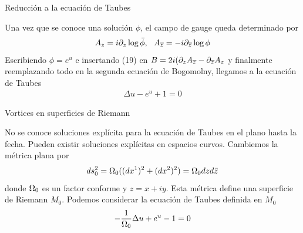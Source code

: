 \documentclass[11pt,t]{beamer}
\begin{document}
\begin{frame}{Reducción a la ecuación de Taubes}

Una vez que se conoce una solución $\phi$, el campo de gauge queda determinado por
\begin{align}
    A_{z} = i\partial_{z}\log\bar\phi, \ \ A_{\overline z} = -i\partial_{\overline z}\log\phi
\end{align}
Escribiendo $\phi=e^{u}$ e insertando (19) en $B = 2i(\partial_z A_{\overline z}-\partial_{\overline z}A_z$ y finalmente reemplazando todo en la segunda ecuación de Bogomolny, llegamos a la ecuación de Taubes \cite{noauthor_jaffe_nodate}
\begin{align}
\Delta u-e^u+1=0
\end{align}


\end{frame}

\begin{frame}{Vortices en superficies de Riemann}

No se conoce soluciones explícita para la ecuación de Taubes en el plano hasta la fecha. Pueden existir soluciones explícitas en espacios curvos. Cambiemos la métrica plana por
\begin{align}
ds_0^2 = \Omega_0((dx^1)^2+(dx^2)^2)=\Omega_0 dzd\bar z
\end{align}
donde $\Omega_0$ es un factor conforme y $z=x+iy$. Esta métrica define una superficie de Riemann $M_0$. Podemos considerar la ecuación de Taubes definida en $M_0$
\begin{align}
-\frac{1}{\Omega_0}\Delta u+e^u-1 =0
\end{align}

\end{frame}
\end{document}
